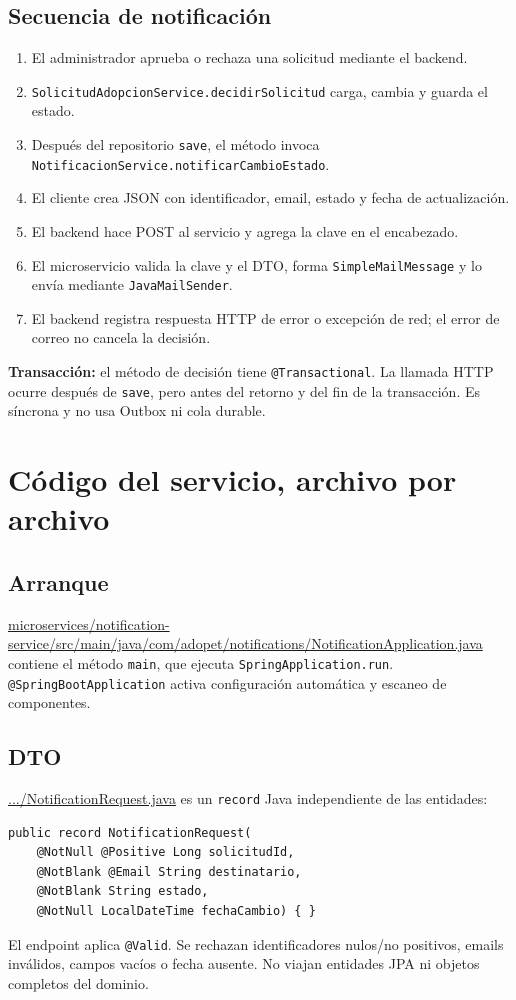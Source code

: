 \documentclass[11pt,a4paper]{article}
\newcommand{\pathcode}[1]{\small\url{#1}}\newcommand{\envvar}[1]{\small\url{#1}}
\begin{document}
\subsection{Secuencia de notificación}
\begin{enumerate}
\item El administrador aprueba o rechaza una solicitud mediante el backend.
\item \texttt{SolicitudAdopcionService.decidirSolicitud} carga, cambia y guarda el estado.
\item Después del repositorio \texttt{save}, el método invoca \texttt{NotificacionService.notificarCambioEstado}.
\item El cliente crea JSON con identificador, email, estado y fecha de actualización.
\item El backend hace POST al servicio y agrega la clave en el encabezado.
\item El microservicio valida la clave y el DTO, forma \texttt{SimpleMailMessage} y lo envía mediante \texttt{JavaMailSender}.
\item El backend registra respuesta HTTP de error o excepción de red; el error de correo no cancela la decisión.
\end{enumerate}
\textbf{Transacción:} el método de decisión tiene \texttt{@Transactional}. La llamada HTTP ocurre después de \texttt{save}, pero antes del retorno y del fin de la transacción. Es síncrona y no usa Outbox ni cola durable.

\section{Código del servicio, archivo por archivo}
\subsection{Arranque}
\pathcode{microservices/notification-service/src/main/java/com/adopet/notifications/NotificationApplication.java} contiene el método \texttt{main}, que ejecuta \texttt{SpringApplication.run}. \texttt{@SpringBootApplication} activa configuración automática y escaneo de componentes.

\subsection{DTO}
\pathcode{.../NotificationRequest.java} es un \texttt{record} Java independiente de las entidades:
\begin{lstlisting}[style=source]
public record NotificationRequest(
    @NotNull @Positive Long solicitudId,
    @NotBlank @Email String destinatario,
    @NotBlank String estado,
    @NotNull LocalDateTime fechaCambio) { }
\end{lstlisting}
El endpoint aplica \texttt{@Valid}. Se rechazan identificadores nulos/no positivos, emails inválidos, campos vacíos o fecha ausente. No viajan entidades JPA ni objetos completos del dominio.
\end{document}
